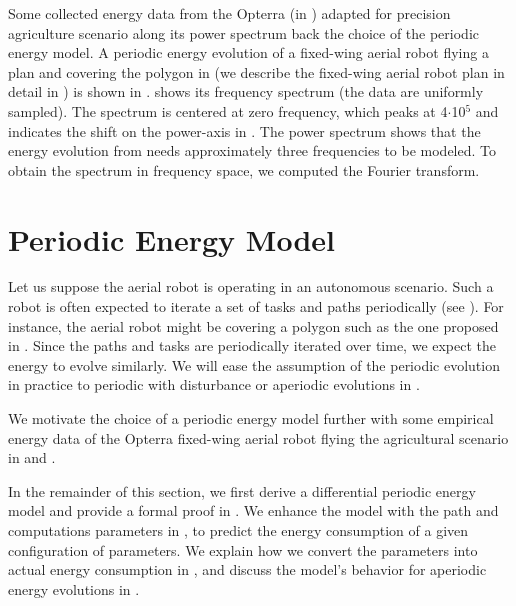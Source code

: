 Some collected energy data from the Opterra (in ) adapted for precision agriculture scenario along its power spectrum back the choice of the periodic energy model. A periodic energy evolution of a fixed-wing aerial robot flying a plan and covering the polygon in  (we describe the fixed-wing aerial robot plan in detail in ) is shown in .  shows its frequency spectrum (the data are uniformly sampled). The spectrum is centered at zero frequency, which peaks at 4$\cdot$10${}^{\text{5}}$ and indicates the shift on the power-axis in . The power spectrum shows that the energy evolution from  needs approximately three frequencies to be modeled. To obtain the spectrum in frequency space, we computed the Fourier transform.


\section{Periodic Energy Model}
\label{sec:periodic-model}

Let us suppose the aerial robot is operating in an autonomous scenario. Such a robot is often expected to iterate a set of tasks and paths periodically (see ). For instance, the aerial robot might be covering a polygon such as the one proposed in . Since the paths and tasks are periodically iterated over time, we expect the energy to evolve similarly. We will ease the assumption of the periodic evolution in practice to periodic with disturbance or aperiodic evolutions in . 

We motivate the choice of a periodic energy model further with some empirical energy data of the Opterra fixed-wing aerial robot flying the agricultural scenario in  and .

In the remainder of this section, we first derive a differential periodic energy model and provide a formal proof in . We enhance the model with the path and computations parameters in , to predict the energy consumption of a given configuration of parameters. We explain how we convert the parameters into actual energy consumption in , and discuss the model's behavior for aperiodic energy evolutions in .

